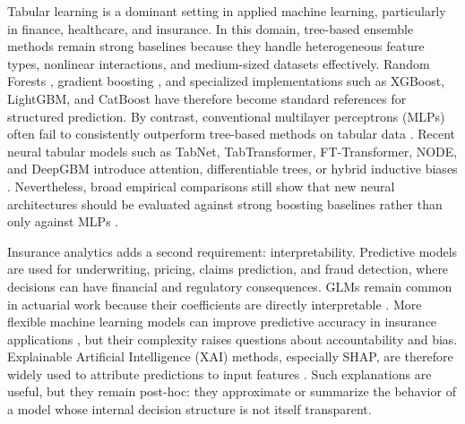\documentclass{article}
\begin{document}
Tabular learning is a dominant setting in applied machine learning, particularly in finance, healthcare, and insurance. In this domain, tree-based ensemble methods remain strong baselines because they handle heterogeneous feature types, nonlinear interactions, and medium-sized datasets effectively. Random Forests \cite{Breiman2001}, gradient boosting \cite{Friedman2001}, and specialized implementations such as XGBoost, LightGBM, and CatBoost \cite{ChenGuestrin2016,Ke2017,Prokhorenkova2018} have therefore become standard references for structured prediction. By contrast, conventional multilayer perceptrons (MLPs) often fail to consistently outperform tree-based methods on tabular data \cite{ShwartzZiv2022,Grinsztajn2022}. Recent neural tabular models such as TabNet, TabTransformer, FT-Transformer, NODE, and DeepGBM introduce attention, differentiable trees, or hybrid inductive biases \cite{ArikPfister2021,Huang2020,Gorishniy2021,Popov2020,Ke2019}. Nevertheless, broad empirical comparisons still show that new neural architectures should be evaluated against strong boosting baselines rather than only against MLPs \cite{ShwartzZiv2022,Grinsztajn2022}.

Insurance analytics adds a second requirement: interpretability. Predictive models are used for underwriting, pricing, claims prediction, and fraud detection, where decisions can have financial and regulatory consequences. GLMs remain common in actuarial work because their coefficients are directly interpretable \cite{Frees2009}. More flexible machine learning models can improve predictive accuracy in insurance applications \cite{Henckaerts2021,Richman2021}, but their complexity raises questions about accountability and bias. Explainable Artificial Intelligence (XAI) methods, especially SHAP, are therefore widely used to attribute predictions to input features \cite{LundbergLee2017,Guidotti2018}. Such explanations are useful, but they remain post-hoc: they approximate or summarize the behavior of a model whose internal decision structure is not itself transparent.
\end{document}
